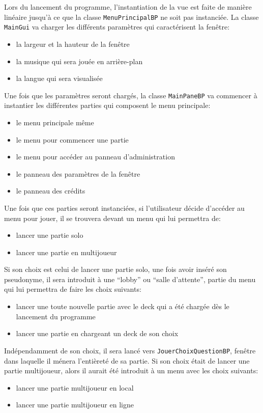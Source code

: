 Lors du lancement du programme, l'instantiation de la vue est faite de manière linéaire jusqu'à ce que la classe \verb|MenuPrincipalBP| ne soit pas instanciée.
La classe \verb|MainGui| va charger les différents paramètres qui caractérisent la fenêtre:
\begin{itemize}
\item la largeur et la hauteur de la fenêtre
\item la musique qui sera jouée en arrière-plan
\item la langue qui sera visualisée
\end{itemize}
Une fois que les paramètres seront chargés, la classe \verb|MainPaneBP| va commencer à instantier les différentes parties qui composent le menu principale:
\begin{itemize}
\item le menu principale même
\item le menu pour commencer une partie
\item le menu pour accéder au panneau d'administration
\item le panneau des paramètres de la fenêtre
\item le panneau des crédits
\end{itemize}
Une fois que ces parties seront instanciées, si l'utilisateur décide d'accéder au menu pour jouer, il se trouvera devant un menu qui lui permettra de:
\begin{itemize}
\item lancer une partie solo
\item lancer une partie en multijoueur
\end{itemize}
Si son choix est celui de lancer une partie solo, une fois avoir inséré son pseudonyme, il sera introduit à une \enquote{lobby} ou \enquote{salle d'attente}, partie du menu qui lui permettra de faire les choix suivants:
\begin{itemize}
\item lancer une toute nouvelle partie avec le deck qui a été chargée dès le lancement du programme
\item lancer une partie en chargeant un deck de son choix
\end{itemize}
Indépendamment de son choix, il sera lancé vers \verb|JouerChoixQuestionBP|, fenêtre dans laquelle il ménera l'entièreté de sa partie.
Si son choix était de lancer une partie multijoueur, alors il aurait été introduit à un menu avec les choix suivants:
\begin{itemize}
\item lancer une partie multijoueur en local
\item lancer une partie multijoueur en ligne
\end{itemize}
